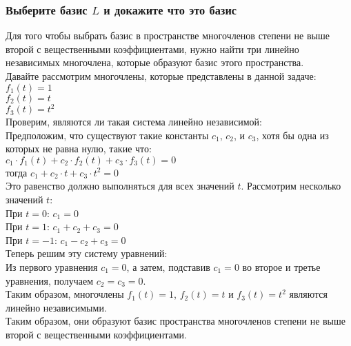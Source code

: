 \documentclass{article}
\begin{document}
    \subsubsection{Выберите базис $L$ и докажите что это базис}
    Для того чтобы выбрать базис в пространстве многочленов степени не
    выше второй с вещественными коэффициентами, нужно найти три
    линейно независимых многочлена, которые образуют базис этого
    пространства.\\
    Давайте рассмотрим многочлены, которые представлены в данной
    задаче:\\
    $f_1(t) = 1$\\
    $f_2(t) = t$\\
    $f_3(t) = t^2$\\
    Проверим, являются ли такая система линейно независимой:\\
    Предположим, что существуют такие константы $c_1$, $c_2$, и $c_3$, хотя бы одна
    из которых не равна нулю, такие что:\\
    $c_1  \cdot  f_1(t) + c_2  \cdot  f_2(t) + c_3  \cdot  f_3(t)=0$\\
    тогда $c_1 + c_2  \cdot  t+c_3  \cdot  t^2 = 0$\\
    Это равенство должно выполняться для всех значений $t$. Рассмотрим
    несколько значений $t$:\\
    При $t = 0$: $c_1 = 0$\\
    При $t = 1$: $c_1 + c_2 + c_3 = 0$\\
    При $t =-1$: $c_1 - c_2 + c_3 = 0$\\
    Теперь решим эту систему уравнений:\\
    Из первого уравнения $c_1 = 0$, а затем, подставив $c_1 = 0$ во второе и третье
    уравнения, получаем $c_2 = c_3 = 0$.\\
    Таким образом, многочлены $f_1(t)=1$, $f_2(t)=t$ и $f_3(t)=t^2$ являются линейно
    независимыми.\\
    Таким образом, они образуют базис пространства многочленов степени
    не выше второй с вещественными коэффициентами.\\
    
\end{document}
